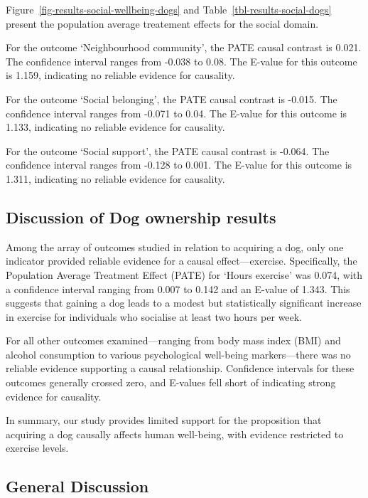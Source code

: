 \documentclass[
  singlecolumn,
  9pt]{article}
\begin{document}
Figure~\ref{fig-results-social-wellbeing-dogs} and
Table~\ref{tbl-results-social-dogs} present the population average
treatement effects for the social domain.

For the outcome `Neighbourhood community', the PATE causal contrast is
0.021. The confidence interval ranges from -0.038 to 0.08. The E-value
for this outcome is 1.159, indicating no reliable evidence for
causality.

For the outcome `Social belonging', the PATE causal contrast is -0.015.
The confidence interval ranges from -0.071 to 0.04. The E-value for this
outcome is 1.133, indicating no reliable evidence for causality.

For the outcome `Social support', the PATE causal contrast is -0.064.
The confidence interval ranges from -0.128 to 0.001. The E-value for
this outcome is 1.311, indicating no reliable evidence for causality.

\subsection{Discussion of Dog ownership
results}\label{discussion-of-dog-ownership-results}

Among the array of outcomes studied in relation to acquiring a dog, only
one indicator provided reliable evidence for a causal effect---exercise.
Specifically, the Population Average Treatment Effect (PATE) for `Hours
exercise' was 0.074, with a confidence interval ranging from 0.007 to
0.142 and an E-value of 1.343. This suggests that gaining a dog leads to
a modest but statistically significant increase in exercise for
individuals who socialise at least two hours per week.

For all other outcomes examined---ranging from body mass index (BMI) and
alcohol consumption to various psychological well-being markers---there
was no reliable evidence supporting a causal relationship. Confidence
intervals for these outcomes generally crossed zero, and E-values fell
short of indicating strong evidence for causality.

In summary, our study provides limited support for the proposition that
acquiring a dog causally affects human well-being, with evidence
restricted to exercise levels.

\subsection{General Discussion}\label{general-discussion}
\end{document}
